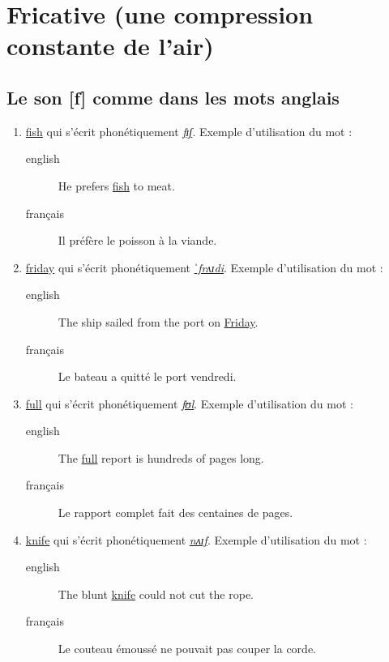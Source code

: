 \section{Fricative (une compression constante de l'air)}
\label{sec:org3b742bc}
\subsection{Le son [f] comme dans les mots anglais}
\label{sec:org2a4125a}
\begin{enumerate}
\item \href{http://www.wordreference.com/enfr/fish}{fish} qui s'écrit phonétiquement \href{https://en.oxforddictionaries.com/definition/fish}{\emph{fɪʃ}}. Exemple d'utilisation du mot : 
\begin{description}
\item[{english}] \textenglish{He prefers \href{https://youtu.be/rEm4ynLtGx4}{fish} to meat.}
\item[{français}] Il préfère le poisson à la viande.
\end{description}
\item \href{http://www.wordreference.com/enfr/friday}{friday} qui s'écrit phonétiquement \href{https://en.oxforddictionaries.com/definition/friday}{\emph{ˈfrʌɪdi}}. Exemple d'utilisation du mot :
\begin{description}
\item[{english}] \textenglish{The ship sailed from the port on \href{https://youtu.be/lQ\_pgrjjHLo}{Friday}.}
\item[{français}] Le bateau a quitté le port vendredi.
\end{description}
\item \href{http://www.wordreference.com/enfr/full}{full} qui s'écrit phonétiquement \href{https://en.oxforddictionaries.com/definition/full}{\emph{fʊl}}. Exemple d'utilisation du mot : 
\begin{description}
\item[{english}] \textenglish{The \href{https://youtu.be/LR73DrKX\_bs}{full} report is hundreds of pages long.}
\item[{français}] Le rapport complet fait des centaines de pages.
\end{description}
\item \href{http://www.wordreference.com/enfr/knife}{knife} qui s'écrit phonétiquement \href{https://en.oxforddictionaries.com/definition/knife}{\emph{nʌɪf}}. Exemple d'utilisation du mot : 
\begin{description}
\item[{english}] \textenglish{The blunt \href{https://youtu.be/JUyzH9HpkqE}{knife} could not cut the rope.}
\item[{français}] Le couteau émoussé ne pouvait pas couper la corde.
\end{description}
\end{enumerate}
